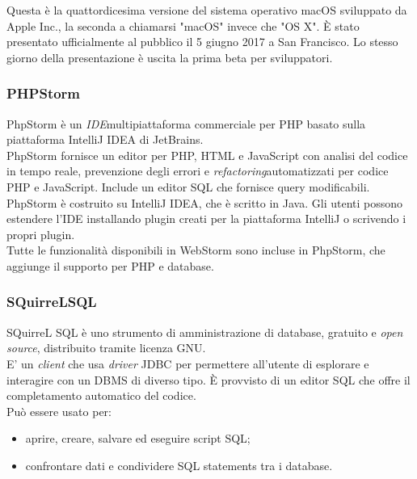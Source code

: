Questa è la quattordicesima versione del sistema operativo macOS sviluppato da Apple Inc., la seconda a chiamarsi "macOS" invece che "OS X". È stato presentato ufficialmente al pubblico il 5 giugno 2017 a San Francisco. Lo stesso giorno della presentazione è uscita la prima beta per sviluppatori.

\subsubsection{PHPStorm}
PhpStorm è un \emph{IDE}\glsfirstoccur multipiattaforma commerciale per PHP basato sulla piattaforma IntelliJ IDEA di JetBrains.
\\
PhpStorm fornisce un editor per PHP, HTML e JavaScript con analisi del codice in tempo reale, prevenzione degli errori e \emph{refactoring}\glsfirstoccur automatizzati per codice PHP e JavaScript. Include un editor SQL che fornisce query modificabili.
\\
PhpStorm è costruito su IntelliJ IDEA, che è scritto in Java. Gli utenti possono estendere l'IDE installando plugin creati per la piattaforma IntelliJ o scrivendo i propri plugin.
\\
Tutte le funzionalità disponibili in WebStorm sono incluse in PhpStorm, che aggiunge il supporto per PHP e database.

\subsubsection{SQuirreLSQL}
SQuirreL SQL è uno strumento di amministrazione di database, gratuito e \textit{open source}, distribuito tramite licenza GNU.
\\
E' un \textit{client} che usa \textit{driver} JDBC per permettere all'utente di esplorare e interagire con un DBMS di diverso tipo. È provvisto di un editor SQL che offre il completamento automatico del codice.
\\
Può essere usato per:
\begin{itemize}
    \item aprire, creare, salvare ed eseguire script SQL;
    
    \item confrontare dati e condividere SQL statements tra i database.
\end{itemize}

